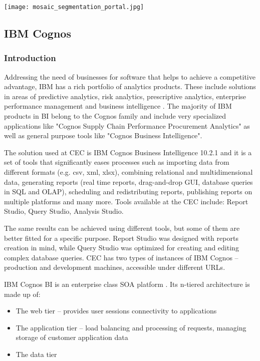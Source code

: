 \begin{center}
  \texttt{[image: mosaic\_segmentation\_portal.jpg]}
\end{center}


		\subsection{IBM Cognos}
		
			\subsubsection{Introduction}
			
Addressing the need of businesses for software that helps to achieve a competitive advantage, IBM has a rich portfolio of analytics products. These include solutions in areas of predictive analytics, risk analytics, prescriptive analytics, enterprise performance management and business intelligence \citep{IBM2015b}. The majority of IBM products in BI belong to the Cognos family and include very specialized applications like "Cognos Supply Chain Performance Procurement Analytics" as well as general purpose tools like "Cognos Business Intelligence".

The solution used at CEC is IBM Cognos Business Intelligence 10.2.1 and it is a set of tools that significantly eases processes such as importing data from different formats (e.g. csv, xml, xlsx), combining relational and multidimensional data, generating reports (real time reports, drag-and-drop GUI, database queries in SQL and OLAP), scheduling and redistributing reports, publishing reports on multiple platforms and many more. Tools available at the CEC include: Report Studio, Query Studio, Analysis Studio.

The same results can be achieved using different tools, but some of them are better fitted for a specific purpose. Report Studio was designed with reports creation in mind, while Query Studio was optimized for creating and editing complex database queries. CEC has two types of instances of IBM Cognos – production and development machines, accessible under different URLs.

IBM Cognos BI is an enterprise class SOA platform \citep{browne2010ibm}. Its n-tiered architecture is made up of:
\begin{itemize}
\item The web tier – provides user sessions connectivity to applications
\item The application tier – load balancing and processing of requests, managing storage of customer application data
\item The data tier
\end{itemize}


